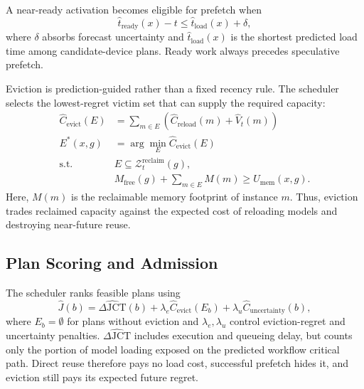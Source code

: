 \documentclass{article}
\begin{document}
A near-ready activation becomes eligible for prefetch when
\begin{equation}
    \hat{t}_{\mathrm{ready}}(x)-t
    \le \hat{t}_{\mathrm{load}}(x)+\delta,
    \label{eq:prefetch-window}
\end{equation}
where $\delta$ absorbs forecast uncertainty and $\hat{t}_{\mathrm{load}}(x)$ is
the shortest predicted load time among candidate-device plans. Ready work always
precedes speculative prefetch.

Eviction is prediction-guided rather than a fixed recency rule. The scheduler
selects the lowest-regret victim set that can supply the required capacity:
\begin{equation}
    \begin{aligned}
        \widehat{C}_{\mathrm{evict}}(E)
        &=\sum_{m\in E}
        \left(\widehat{C}_{\mathrm{reload}}(m)+\widehat{V}_t(m)\right)\\
        E^*(x,g)&=\arg\min_E\widehat{C}_{\mathrm{evict}}(E)\\
        \text{s.t.}\quad
        &E\subseteq\mathcal{Z}^{\mathrm{reclaim}}_t(g),\\
        &M_{\mathrm{free}}(g)+\sum_{m\in E}M(m)
        \ge U_{\mathrm{mem}}(x,g).
    \end{aligned}
    \label{eq:eviction-regret}
\end{equation}
Here, $M(m)$ is the reclaimable memory footprint of instance $m$. Thus,
eviction trades reclaimed capacity against the expected cost of reloading models
and destroying near-future reuse.

\subsection{Plan Scoring and Admission}

The scheduler ranks feasible plans using
\begin{equation}
    \widehat{J}(b)
    =\widehat{\Delta\mathrm{JCT}}(b)
    +\lambda_e\widehat{C}_{\mathrm{evict}}(E_b)
    +\lambda_u\widehat{C}_{\mathrm{uncertainty}}(b),
    \label{eq:lifecycle-objective}
\end{equation}
where $E_b=\emptyset$ for plans without eviction and $\lambda_e,\lambda_u$
control eviction-regret and uncertainty penalties.
$\widehat{\Delta\mathrm{JCT}}$ includes execution and queueing delay, but counts
only the portion of model loading exposed on the predicted workflow critical
path. Direct reuse therefore pays no load cost, successful prefetch hides it,
and eviction still pays its expected future regret.
\end{document}
